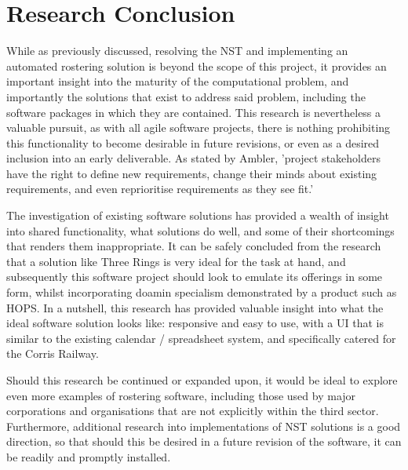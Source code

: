 \section{Research Conclusion}
While as previously discussed, resolving the NST and implementing an automated rostering solution is beyond the scope of this project, it provides an important insight into the maturity of the computational problem, and importantly the solutions that exist to address said problem, including the software packages in which they are contained. This research is nevertheless a valuable pursuit, as with all agile software projects, there is nothing prohibiting this functionality to become desirable in future revisions, or even as a desired inclusion into an early deliverable. As stated by Ambler, 'project stakeholders have the right to define new requirements, change their minds about existing requirements, and even reprioritise requirements as they see fit.' \cite{Ambler2}

The investigation of existing software solutions has provided a wealth of insight into shared functionality, what solutions do well, and some of their shortcomings that renders them inappropriate. It can be safely concluded from the research that a solution like Three Rings is very ideal for the task at hand, and subsequently this software project should look to emulate its offerings in some form, whilst incorporating doamin specialism demonstrated by a product such as HOPS. In a nutshell, this research has provided valuable insight into what the ideal software solution looks like: responsive and easy to use, with a UI that is similar to the existing calendar / spreadsheet system, and specifically catered for the Corris Railway.

Should this research be continued or expanded upon, it would be ideal to explore even more examples of rostering software, including those used by major corporations and organisations that are not explicitly within the third sector. Furthermore, additional research into implementations of NST solutions is a good direction, so that should this be desired in a future revision of the software, it can be readily and promptly installed.